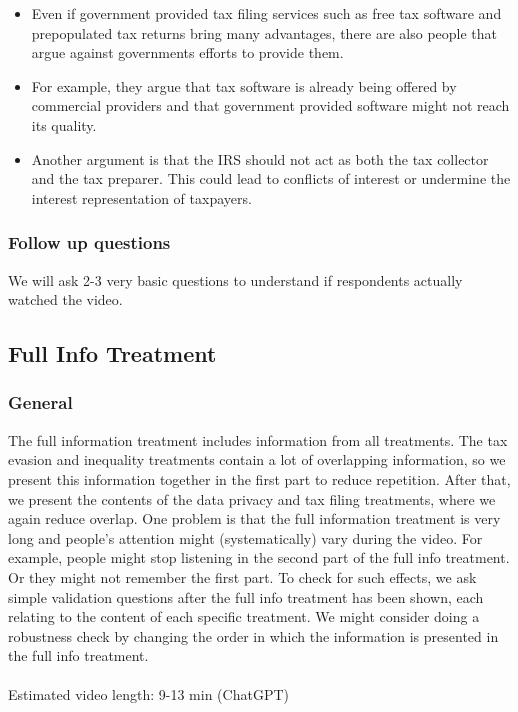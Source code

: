 \documentclass[11pt]{article}
\begin{document}
\begin{itemize}
\begin{itemize}
        \item Even if government provided tax filing services such as free tax software and prepopulated tax returns bring many advantages, there are also people that argue against governments efforts to provide them.
        \item For example, they argue that tax software is already being offered by commercial providers and that government provided software might not reach its quality. 
        \item Another argument is that the IRS should not act as both the tax collector and the tax preparer. This could lead to conflicts of interest or undermine the interest representation of taxpayers.
    \end{itemize}
\end{itemize}
\subsubsection*{Follow up questions}
We will ask 2-3 very basic questions to understand if respondents actually watched the video.
\subsection{Full Info Treatment}
\subsubsection*{General}
The full information treatment includes information from all treatments. The tax evasion and inequality treatments contain a lot of overlapping information, so we present this information together in the first part to reduce repetition. After that, we present the contents of the data privacy and tax filing treatments, where we again reduce overlap.   
One problem is that the full information treatment is very long and people's attention might (systematically) vary during the video. For example, people might stop listening in the second part of the full info treatment. Or they might not remember the first part. To check for such effects, we ask simple validation questions after the full info treatment has been shown, each relating to the content of each specific treatment. We might consider doing a robustness check by changing the order in which the information is presented in the full info treatment.\\ \\  
Estimated video length: 9-13 min (ChatGPT)
\end{document}
